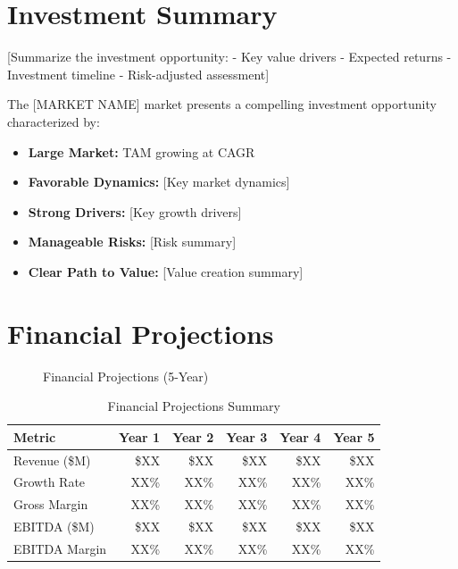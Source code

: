 \documentclass[11pt,letterpaper]{report}
\newcommand{\reporttitle}{[MARKET NAME]}
\begin{document}
\section{Investment Summary}

[Summarize the investment opportunity:
- Key value drivers
- Expected returns
- Investment timeline
- Risk-adjusted assessment]

\begin{executivesummarybox}
The \reporttitle{} market presents a compelling investment opportunity characterized by:

\begin{itemize}
    \item \textbf{Large Market:}  TAM growing at  CAGR
    \item \textbf{Favorable Dynamics:} [Key market dynamics]
    \item \textbf{Strong Drivers:} [Key growth drivers]
    \item \textbf{Manageable Risks:} [Risk summary]
    \item \textbf{Clear Path to Value:} [Value creation summary]
\end{itemize}
\end{executivesummarybox}

\section{Financial Projections}


\begin{figure}[htbp]
\centering
\caption{Financial Projections (5-Year)}
\label{fig:financials}
\end{figure}

\begin{table}[htbp]
\centering
\caption{Financial Projections Summary}
\begin{tabular}{@{}lrrrrr@{}}
\toprule
\textbf{Metric} & \textbf{Year 1} & \textbf{Year 2} & \textbf{Year 3} & \textbf{Year 4} & \textbf{Year 5} \\
\midrule
Revenue (\$M) & \$XX & \$XX & \$XX & \$XX & \$XX \\
\rowcolor{tablealt} Growth Rate & XX\% & XX\% & XX\% & XX\% & XX\% \\
Gross Margin & XX\% & XX\% & XX\% & XX\% & XX\% \\
\rowcolor{tablealt} EBITDA (\$M) & \$XX & \$XX & \$XX & \$XX & \$XX \\
EBITDA Margin & XX\% & XX\% & XX\% & XX\% & XX\% \\
\bottomrule
\end{tabular}
\label{tab:financials}
\end{table}
\end{document}
